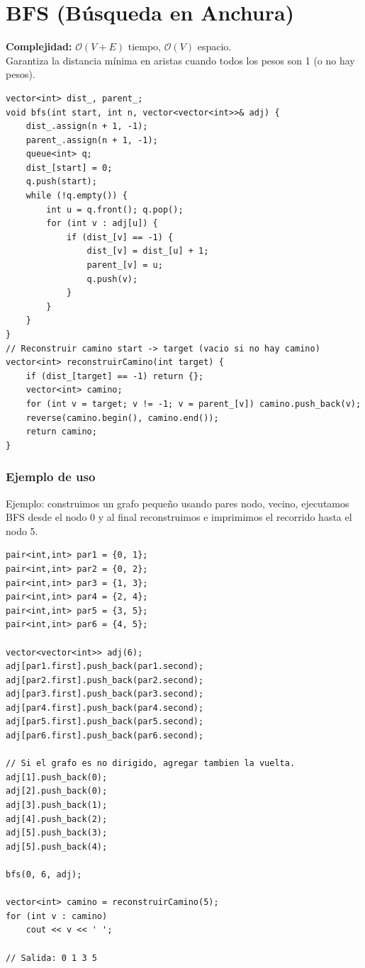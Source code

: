 \documentclass[10pt,twocolumn,letterpaper]{report}
\begin{document}
\section{BFS (Búsqueda en Anchura)}
\textbf{Complejidad:} $\mathcal{O}(V + E)$ tiempo, $\mathcal{O}(V)$ espacio. \\
Garantiza la distancia mínima en aristas cuando todos los pesos son 1 (o no hay pesos).
\begin{lstlisting}
vector<int> dist_, parent_;
void bfs(int start, int n, vector<vector<int>>& adj) {
    dist_.assign(n + 1, -1);
    parent_.assign(n + 1, -1);
    queue<int> q;
    dist_[start] = 0;
    q.push(start);
    while (!q.empty()) {
        int u = q.front(); q.pop();
        for (int v : adj[u]) {
            if (dist_[v] == -1) {
                dist_[v] = dist_[u] + 1;
                parent_[v] = u;
                q.push(v);
            }
        }
    }
}
// Reconstruir camino start -> target (vacio si no hay camino)
vector<int> reconstruirCamino(int target) {
    if (dist_[target] == -1) return {};
    vector<int> camino;
    for (int v = target; v != -1; v = parent_[v]) camino.push_back(v);
    reverse(camino.begin(), camino.end());
    return camino;
}
\end{lstlisting}
\subsubsection*{Ejemplo de uso}
Ejemplo: construimos un grafo pequeño usando pares {nodo, vecino}, ejecutamos BFS desde el nodo 0 y al final reconstruimos e imprimimos el recorrido hasta el nodo 5.
\begin{lstlisting}
pair<int,int> par1 = {0, 1};
pair<int,int> par2 = {0, 2};
pair<int,int> par3 = {1, 3};
pair<int,int> par4 = {2, 4};
pair<int,int> par5 = {3, 5};
pair<int,int> par6 = {4, 5};

vector<vector<int>> adj(6);
adj[par1.first].push_back(par1.second);
adj[par2.first].push_back(par2.second);
adj[par3.first].push_back(par3.second);
adj[par4.first].push_back(par4.second);
adj[par5.first].push_back(par5.second);
adj[par6.first].push_back(par6.second);

// Si el grafo es no dirigido, agregar tambien la vuelta.
adj[1].push_back(0);
adj[2].push_back(0);
adj[3].push_back(1);
adj[4].push_back(2);
adj[5].push_back(3);
adj[5].push_back(4);

bfs(0, 6, adj);

vector<int> camino = reconstruirCamino(5);
for (int v : camino)
    cout << v << ' ';

// Salida: 0 1 3 5
\end{lstlisting}
\end{document}
